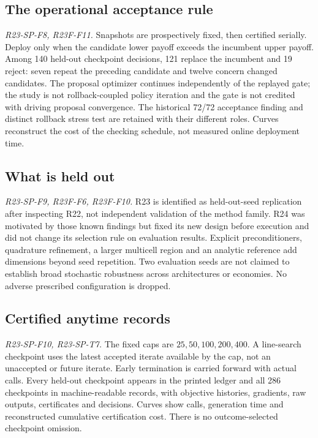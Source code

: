 \subsection{The operational acceptance rule}
\noindent\textit{R23-SP-F8, R23F-F11.}
Snapshots are prospectively fixed, then certified serially. Deploy only when the candidate lower payoff exceeds the incumbent upper payoff. Among 140 held-out checkpoint decisions, 121 replace the incumbent and 19 reject: seven repeat the preceding candidate and twelve concern changed candidates. The proposal optimizer continues independently of the replayed gate; the study is not rollback-coupled policy iteration and the gate is not credited with driving proposal convergence. The historical 72/72 acceptance finding and distinct rollback stress test are retained with their different roles. Curves reconstruct the cost of the checking schedule, not measured online deployment time.

\subsection{What is held out}
\noindent\textit{R23-SP-F9, R23F-F6, R23F-F10.}
R23 is identified as held-out-seed replication after inspecting R22, not independent validation of the method family. R24 was motivated by those known findings but fixed its new design before execution and did not change its selection rule on evaluation results. Explicit preconditioners, quadrature refinement, a larger multicell region and an analytic reference add dimensions beyond seed repetition. Two evaluation seeds are not claimed to establish broad stochastic robustness across architectures or economies. No adverse prescribed configuration is dropped.

\subsection{Certified anytime records}
\noindent\textit{R23-SP-F10, R23-SP-T7.}
The fixed caps are $25,50,100,200,400$. A line-search checkpoint uses the latest accepted iterate available by the cap, not an unaccepted or future iterate. Early termination is carried forward with actual calls. Every held-out checkpoint appears in the printed ledger and all 286 checkpoints in machine-readable records, with objective histories, gradients, raw outputs, certificates and decisions. Curves show calls, generation time and reconstructed cumulative certification cost. There is no outcome-selected checkpoint omission.


